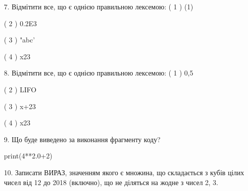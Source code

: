 \documentclass[11pt]{article}
\begin{document}
7. %
Відмітити все, що є однією правильною лексемою:
( 1 ) (1)

( 2 ) 0.2E3

( 3 ) "abc'

( 4 ) x23
\vspace{5mm}

8. %
Відмітити все, що є однією правильною лексемою:
( 1 ) 0,5

( 2 ) LIFO

( 3 ) x+23

( 4 ) x23
\vspace{5mm}

9. Що буде виведено за виконання фрагменту коду?

print(4**2.0+2)
\vspace{5mm}

10. 
Записати ВИРАЗ, значенням якого є множина, що складається з кубів цілих чисел від 12 до 2018 (включно), що не діляться на жодне з чисел 2, 3.\vspace{5mm}

\newpage
\end{document}
